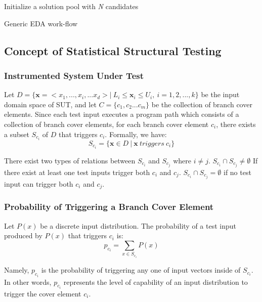 \documentclass[journal]{IEEEtran}
\renewcommand{\vec}[1]{\mathbf{#1}}
\begin{document}
\begin{algorithm}[t]

	Initialize a solution pool with \emph{N} candidates\;
	\caption{Generic EDA work-flow}
		\label{algorithm:1}
\end{algorithm}
\subsection{Concept of Statistical Structural Testing}
\subsubsection{Instrumented System Under Test} Let \(D = \{\vec{x}=<x_1,...,x_i,...x_d>|\ L_{i} \leq \vec{x}_i \leq U_{i},\ i = 1, 2, ..., k\}\) be the input domain space of SUT, and let \(C = {\{c_1,c_2 ...c_m\}}\) be the collection of branch cover elements.
Since each test input executes a program path which consists of a collection of branch cover elements,
for each branch cover element \(c_{i}\), there exists a subset \(S_{c_{i}}\) of \(D\) that triggers \(c_{i}\). Formally, we have:
\[S_{c_i} = \{\vec{x}\in D\ |\ \vec{x}\ triggers\ c_{i}\}\]

There exist two types of relations between \(S_{c_i}\) and \(S_{c_j}\) where \(i \neq j\). \(S_{c_i} \cap S_{c_j} \neq \emptyset\) If there exist at least one test inputs trigger both \(c_{i}\) and \(c_{j}\). \(S_{c_i} \cap S_{c_j} = \emptyset\) if no test input can trigger both \(c_{i}\) and \(c_{j}\).\\
\subsubsection{Probability of Triggering a Branch Cover Element}
Let \(P(x)\) be a discrete input distribution. The probability of a test input produced by \(P(x)\) that triggers \(c_{i}\) is:\[\tag{1}\label{eq:ability}p_{c_i} = \sum_{x \in S_{c_i}} P(x)\]

Namely, \(p_{c_{i}}\) is the probability of triggering any one of input vectors inside of \(S_{c_i}\).
In other words, \(p_{c_{i}}\) represents the level of capability of an input distribution to trigger the cover element \(c_{i}\).
\end{document}
